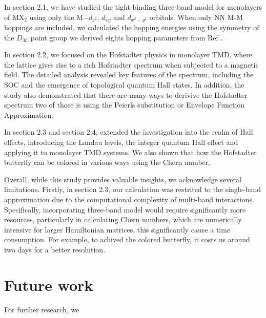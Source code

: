 \documentclass{report}
\begin{document}
In section 2.1, we have studied the tight-binding three-band model for monolayers of MX$_{2}$ using only the M$-d_{z^{2}}$, $d_{xy}$ and $d_{x^{2} - y{^2}}$ orbitals. When only NN M-M hoppings are included, we calculated the hopping energies using the symmetry of the $D_{3h}$ point group we derived eights hopping parameters from Ref \cite{PhysRevB.88.085433}.

In section 2.2, we focused on the Hofstadter physics in monolayer TMD, where the lattice gives rise to a rich Hofstadter spectrum when subjected to a magnetic field. The detailed analysis revealed key features of the spectrum, including the SOC and the emergence of topological quantum Hall states. In addition, the study also demonstrated that there are many ways to derivive the Hofstadter spectrum two of those is using the Peierls substitution or Envelope Function Approximation.

In section 2.3 and section 2.4, extended the investigation into the realm of Hall effects, introducing the Landau levels, the integer quantum Hall effect and applying it to monolayer TMD systems. We also shown that how the Hofstadter butterfly can be colored in various ways using the Chern number.

Overall, while this study provides valuable insights, we acknowledge several limitations. Firstly, in section 2.3, our calculation was restrited to the single-band approximation due to the computational complexity of multi-band interactions. Specifically, incorporating three-band model would require significantly more resources, particularly in calculating Chern numbers, which are numerically intensive for larger Hamiltonian matrices, this significantly cause a time consumption. For example, to achived the colored butterfly, it costs us around two days for a better resolution.
\section{Future work}
For further research, we 




\appendix
\renewcommand{\chaptername}{Appendix}
\end{document}
